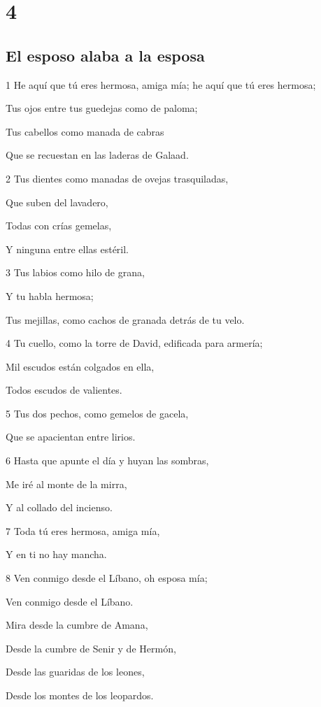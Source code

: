 \chapter{4}

\section*{El esposo alaba a la esposa}

\par 1 He aquí que tú eres hermosa, amiga mía; he aquí que tú eres hermosa;
\par Tus ojos entre tus guedejas como de paloma;
\par Tus cabellos como manada de cabras
\par Que se recuestan en las laderas de Galaad.
\par 2 Tus dientes como manadas de ovejas trasquiladas,
\par Que suben del lavadero,
\par Todas con crías gemelas,
\par Y ninguna entre ellas estéril.
\par 3 Tus labios como hilo de grana,
\par Y tu habla hermosa;
\par Tus mejillas, como cachos de granada detrás de tu velo.
\par 4 Tu cuello, como la torre de David, edificada para armería;
\par Mil escudos están colgados en ella,
\par Todos escudos de valientes.
\par 5 Tus dos pechos, como gemelos de gacela,
\par Que se apacientan entre lirios.
\par 6 Hasta que apunte el día y huyan las sombras,
\par Me iré al monte de la mirra,
\par Y al collado del incienso.
\par 7 Toda tú eres hermosa, amiga mía,
\par Y en ti no hay mancha.
\par 8 Ven conmigo desde el Líbano, oh esposa mía;
\par Ven conmigo desde el Líbano.
\par Mira desde la cumbre de Amana,
\par Desde la cumbre de Senir y de Hermón,
\par Desde las guaridas de los leones,
\par Desde los montes de los leopardos.
